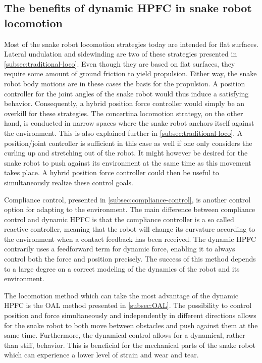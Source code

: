 \subsection{The benefits of dynamic HPFC in snake robot locomotion}

Most of the snake robot locomotion strategies today are intended for flat surfaces. Lateral undulation and sidewinding are two of these strategies presented in \ref{subsec:traditional-loco}. Even though they are based on flat surfaces, they require some amount of ground friction to yield propulsion. Either way, the snake robot body motions are in these cases the basis for the propulsion. A position controller for the joint angles of the snake robot would thus induce a satisfying behavior. Consequently, a hybrid position force controller would simply be an overkill for these strategies. The concertina locomotion strategy, on the other hand, is conducted in narrow spaces where the snake robot anchors itself against the environment. This is also explained further in \ref{subsec:traditional-loco}. A position/joint controller is sufficient in this case as well if one only considers the curling up and stretching out of the robot. It might however be desired for the snake robot to push against its environment at the same time as this movement takes place. A hybrid position force controller could then be useful to simultaneously realize these control goals.

Compliance control, presented in \ref{subsec:compliance-control}, is another control option for adapting to the environment. The main difference between compliance control and dynamic HPFC is that the compliance controller is a so called reactive controller, meaning that the robot will change its curvature according to the environment when a contact feedback has been received. The dynamic HPFC contrarily uses a feedforward term for dynamic force, enabling it to always control both the force and position precisely. The success of this method depends to a large degree on a correct modeling of the dynamics of the robot and its environment.

The locomotion method which can take the most advantage of the dynamic HPFC is the OAL method presented in \ref{subsec:OAL}. The possibility to control position and force simultaneously and independently in different directions allows for the snake robot to both move between obstacles and push against them at the same time. Furthermore, the dynamical control allows for a dynamical, rather than stiff, behavior. This is beneficial for the mechanical parts of the snake robot which can experience a lower level of strain and wear and tear. 



